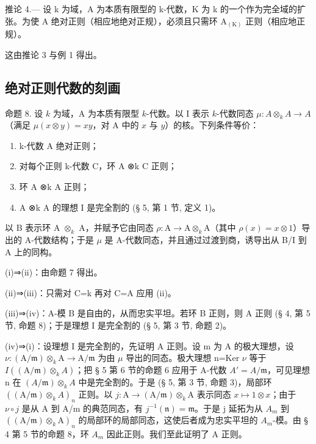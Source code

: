 推论 4.--- 设 k 为域，A 为本质有限型的 k-代数，K 为 k 的一个作为完全域的扩张。为使 A 绝对正则（相应地绝对正规），必须且只需环 \(\mathrm{A}_{(\mathrm{K})}\) 正则（相应地正规）。

这由推论 3 与例 1 得出。

\subsection{绝对正则代数的刻画}

命题 8. 设 \(k\) 为域，A 为本质有限型 \(k\)-代数。以 I 表示 \(k\)-代数同态 \(\mu: A \otimes_k A \to A\)（满足 \(\mu(x \otimes y) = xy\)，对 A 中的 \(x\) 与 \(y\)）的核。下列条件等价：

\begin{enumerate}
\def\labelenumi{(\roman{enumi})}
\item
  k-代数 A 绝对正则；
\item
  对每个正则 k-代数 C，环 A ⊗k C 正则；
\item
  环 A ⊗k A 正则；
\item
  A ⊗k A 的理想 I 是完全割的 (§ 5, 第 1 节, 定义 1)。
\end{enumerate}

以 B 表示环 A \(\otimes_{k}\) A，并赋予它由同态 \(\rho: \mathrm{A} \to \mathrm{A} \otimes_{k} \mathrm{A}\)（其中 \(\rho(x) = x \otimes 1\)）导出的 A-代数结构；于是 \(\mu\) 是 A-代数同态，并且通过过渡到商，诱导出从 B/I 到 A 上的同构。

(i)⇒(ii)：由命题 7 得出。

(ii)⇒(iii)：只需对 C=k 再对 C=A 应用 (ii)。

(iii)⇒(iv)：A-模 B 是自由的，从而忠实平坦。若环 B 正则，则 A 正则 (§ 4, 第 5 节, 命题 8)；于是理想 I 是完全割的 (§ 5, 第 3 节, 命题 2)。

(iv)⇒(i)：设理想 I 是完全割的，先证明 A 正则。设 m 为 A 的极大理想，设 \(\nu:(\mathrm{A}/\mathfrak{m})\otimes_{k}\mathrm{A}\to\mathrm{A}/\mathfrak{m}\) 为由 \(\mu\) 导出的同态。极大理想 n=Ker \(\nu\) 等于 \(I((\mathrm{A}/\mathfrak{m})\otimes_{k}A)\)；把 § 5 第 6 节的命题 6 应用于 A-代数 \(A'=A/\mathfrak m\)，可见理想 n 在 \((A/\mathfrak{m})\otimes_{k}A\) 中是完全割的。于是 (§ 5, 第 3 节, 命题 3)，局部环 \(((\mathrm{A}/\mathfrak{m})\otimes_{k}A)_{n}\) 正则。以 \(j:\mathrm{A}\to(\mathrm{A}/\mathfrak{m})\otimes_{k}\mathrm{A}\) 表示同态 \(x\mapsto1\otimes x\)；由于 \(\nu\circ j\) 是从 A 到 A/m 的典范同态，有 \(j^{-1}(\mathfrak{n})=\mathfrak{m}\)。于是 j 延拓为从 \(A_{m}\) 到 \(((\mathrm{A}/\mathfrak{m})\otimes_{k}\mathrm{A})_{n}\) 的局部环的局部同态，这使后者成为忠实平坦的 \(A_{m}\)-模。由 § 4 第 5 节的命题 8，环 \(A_{m}\) 因此正则。我们至此证明了 A 正则。

